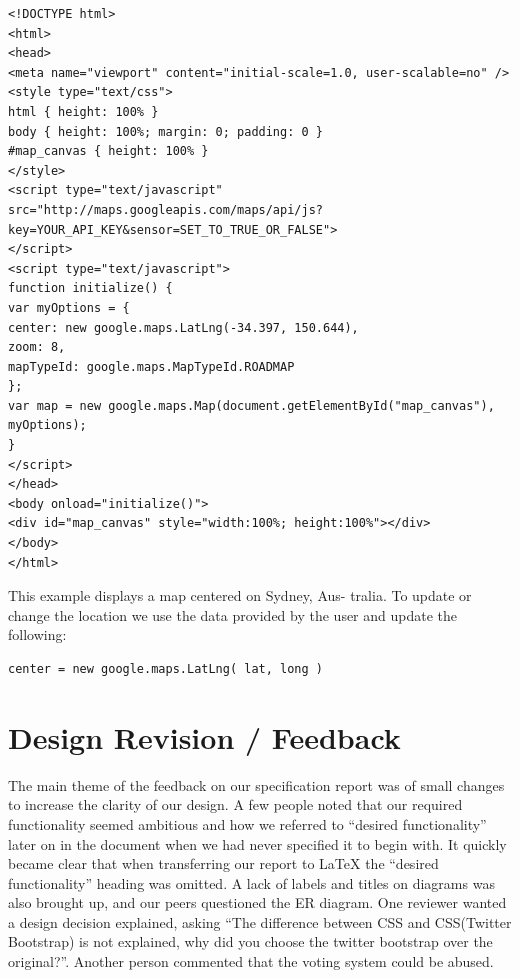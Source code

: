 \documentclass{sig-alt-release2}
\begin{document}
\tiny
\begin{verbatim}
<!DOCTYPE html>
<html>
<head>
<meta name="viewport" content="initial-scale=1.0, user-scalable=no" />
<style type="text/css">
html { height: 100% }
body { height: 100%; margin: 0; padding: 0 }
#map_canvas { height: 100% }
</style>
<script type="text/javascript"
src="http://maps.googleapis.com/maps/api/js?key=YOUR_API_KEY&sensor=SET_TO_TRUE_OR_FALSE">
</script>
<script type="text/javascript">
function initialize() {
var myOptions = {
center: new google.maps.LatLng(-34.397, 150.644),
zoom: 8,
mapTypeId: google.maps.MapTypeId.ROADMAP
};
var map = new google.maps.Map(document.getElementById("map_canvas"),
myOptions);
}
</script>
</head>
<body onload="initialize()">
<div id="map_canvas" style="width:100%; height:100%"></div>
</body>
</html>
\end{verbatim}
\normalsize

This example displays a map centered on Sydney, Aus-
tralia. To update or change the location we use the data
provided by the user and update the following:

\begin{verbatim}
center = new google.maps.LatLng( lat, long )
\end{verbatim}

\newpage
\section{Design Revision / Feedback}
The main theme of the feedback on our specification report was of small changes to increase the clarity of our design. A few people noted that our required functionality seemed ambitious and how we referred to ``desired functionality'' later on in the document when we had never specified it to begin with. It quickly became clear that when transferring our report to LaTeX the ``desired functionality'' heading was omitted. A lack of labels and titles on diagrams was also brought up, and our peers questioned the ER diagram.  One reviewer wanted a design decision explained, asking ``The difference between CSS and CSS(Twitter Bootstrap) is not explained, why did you choose the twitter bootstrap over the original?''. Another person commented that the voting system could be abused.
\end{document}
